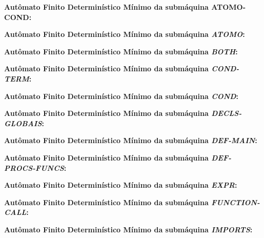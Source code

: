 
\textbf{Autômato Finito Determinístico Mínimo da submáquina ATOMO-COND:}


\textbf{Autômato Finito Determinístico Mínimo da submáquina \emph{ATOMO}:}


\textbf{Autômato Finito Determinístico Mínimo da submáquina \emph{BOTH}:}


\textbf{Autômato Finito Determinístico Mínimo da submáquina \emph{COND-TERM}:}


\textbf{Autômato Finito Determinístico Mínimo da submáquina \emph{COND}:}


\textbf{Autômato Finito Determinístico Mínimo da submáquina \emph{DECLS-GLOBAIS}:}


\textbf{Autômato Finito Determinístico Mínimo da submáquina \emph{DEF-MAIN}:}


\textbf{Autômato Finito Determinístico Mínimo da submáquina \emph{DEF-PROCS-FUNCS}:}


\textbf{Autômato Finito Determinístico Mínimo da submáquina \emph{EXPR}:}


\textbf{Autômato Finito Determinístico Mínimo da submáquina \emph{FUNCTION-CALL}:}


\textbf{Autômato Finito Determinístico Mínimo da submáquina \emph{IMPORTS}:}



